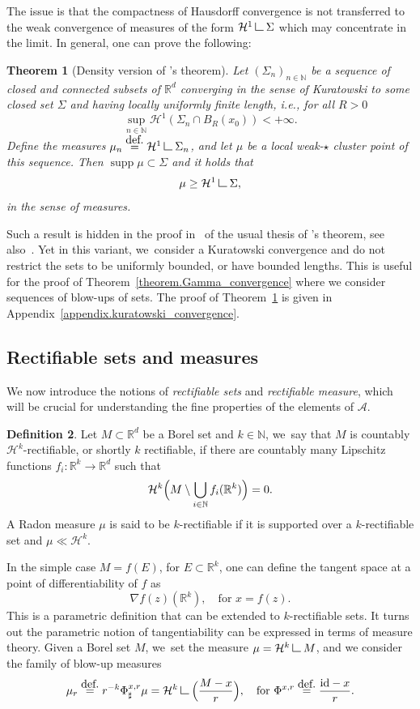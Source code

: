 \documentclass[11pt]{article}
\newcommand{\ie}{i.e.,\xspace}
\numberwithin{equation}{section}
\newtheorem{theorem}{Theorem}[section]
\theoremstyle{definition}
\newtheorem{definition}[theorem]{Definition}
\newcommand{\eqdef}{\ensuremath{\stackrel{\mbox{\upshape\tiny def.}}{=}}}
\newcommand\LM[1]{\hbox{\vrule width.5pt \vbox to#1pt{\vfill \hrule width#1pt height.5pt}}}
\newcommand\LL{{\mathchoice {\>\LM7\>}{\>\LM7\>}{\,\LM5\,}{\,\LM{3.35}\,}}}
\newcommand{\mres}{\LL}
\newcommand\cH{\mathcal{H}}
\newcommand{\RR}{\mathbb{R}}
\DeclareMathOperator{\supp}{supp}
\begin{document}
The issue is that the compactness of Hausdorff convergence is not transferred to the weak convergence of measures of the form $\cH^1\mres \Sigma$ which may concentrate in the limit.
In general, one can prove the following:
\begin{theorem}[Density version of \Golab's theorem]\label{theorem.Golab_localversion}
Let ${(\Sigma_n)}_{n \in \mathbb{N}}$ be a sequence of closed and connected subsets of $\RR^d$ converging in the sense of Kuratowski to some closed set $\Sigma$ and having locally uniformly finite length, \ie for all $R > 0$
\[
\sup_{n \in \mathbb{N}} \cH^1(\Sigma_n \cap B_R(x_0)) < +\infty.
\]
Define the measures $\mu_n \eqdef \cH^1\mres \Sigma_n$, and let $\mu$ be a local weak-$\star$ cluster point of this sequence. Then $\supp\mu \subset \Sigma$ and it holds that
\[
\mu \ge \cH^1\mres \Sigma,
\]
in the sense of measures.
\end{theorem}
Such a result is hidden in the proof in~\cite{ambrosio2004topics} of the usual thesis of \Golab's theorem, see also~\cite{paolini2013existence}. Yet in this variant, we~consider a Kuratowski convergence and do not restrict the sets to be uniformly bounded, or have bounded lengths.
This is useful for the proof of Theorem~\ref{theorem.Gamma_convergence} where we consider sequences of blow-ups of sets. The proof of Theorem~\ref{theorem.Golab_localversion} is given in Appendix~\ref{appendix.kuratowski_convergence}.

\subsection{Rectifiable sets and measures}
We now introduce
the notions of \emph{rectifiable sets} and \emph{rectifiable measure}, which will be crucial for understanding the fine
properties of the elements of $\mathcal{A}$.
\begin{definition}
Let $M \subset \RR^d$ be a Borel set and $k \in \mathbb{N}$, we~say that $M$ is countably $\cH^k$-rectifiable, or shortly $k$ rectifiable, if there are countably many Lipschitz functions $f_i: \RR^k \to \RR^d$ such that
\[
\cH^k\Bigl(
M \setminus \bigcup_{i \in \mathbb{N}} f_i(\RR^k)
\Bigr)
= 0.
\]
A Radon measure $\mu$ is said to be $k$-rectifiable if it is supported over a $k$-rectifiable set and $\mu \ll \cH^k$.
\end{definition}

In the simple case $M = f(E)$, for $E \subset \RR^k$, one can define the tangent space at a point of differentiability of $f$ as
\[
\nabla f(z)(\RR^k), \quad\text{for $x = f(z)$}.
\]
This is a parametric definition that can be extended to $k$-rectifiable sets. It turns out the parametric notion of tangentiability can be expressed in terms of measure theory. Given a Borel set $M$, we~set the measure $\mu = \cH^k\mres M$, and we consider the family of blow-up measures
\begin{equation}\label{blowup_measure_operator}
\mu_r \eqdef r^{-k} \Phi^{x,r}_\sharp \mu = \cH^k\mres \Bigl(\frac{M - x}{r}\Bigr), \quad\text{for }
\Phi^{x,r}\eqdef \frac{\text{id} - x}{r}.
\end{equation}
\end{document}
